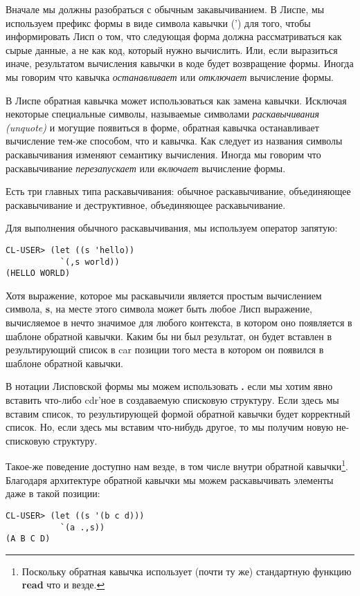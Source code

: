 Вначале мы должны разобраться с обычным закавычиванием. В Лиспе, мы используем префикс формы в виде символа кавычки (') для того, чтобы информировать Лисп о том, что следующая форма должна рассматриваться как сырые данные, а не как код, который нужно вычислить. Или, если выразиться иначе, результатом вычисления кавычки в коде будет возвращение формы. Иногда мы говорим что кавычка \emph{останавливает} или \emph{отключает} вычисление формы.

В Лиспе обратная кавычка может использоваться как замена кавычки. Исключая некоторые специальные символы, называемые символами \emph{раскавычивания (unquote)} и могущие появиться в форме, обратная кавычка останавливает вычисление тем-же способом, что и кавычка. Как следует из названия символы раскавычивания изменяют семантику вычисления. Иногда мы говорим что раскавычивание \emph{перезапускает} или \emph{включает} вычисление формы.

Есть три главных типа раскавычивания: обычное раскавычивание, объединяющее раскавычивание и деструктивное, объединяющее раскавычивание.

Для выполнения обычного раскавычивания, мы используем оператор запятую:

\begin{verbatim}
CL-USER> (let ((s 'hello))
           `(,s world))
(HELLO WORLD)
\end{verbatim}

Хотя выражение, которое мы раскавычили является простым вычислением символа, \textbf{s}, на месте этого символа может быть любое Лисп выражение, вычисляемое в нечто значимое для любого контекста, в котором оно появляется в шаблоне обратной кавычки. Каким бы ни был результат, он будет вставлен в результирующий список в car позиции того места в котором он появился в шаблоне обратной кавычки.

В нотации Лисповской формы мы можем использовать \textbf{.} если мы хотим явно вставить что-либо cdr'ное в создаваемую списковую структуру. Если здесь мы вставим список, то результирующей формой обратной кавычки будет корректный список. Но, если здесь мы вставим что-нибудь другое, то мы получим новую не-списковую структуру.

Такое-же поведение доступно нам везде, в том числе внутри обратной кавычки\footnote{Поскольку обратная кавычка использует (почти ту же) стандартную функцию \textbf{read} что и везде.}. Благодаря архитектуре обратной кавычки мы можем раскавычивать элементы даже в такой позиции:

\begin{verbatim}
CL-USER> (let ((s '(b c d)))
           `(a .,s))
(A B C D)
\end{verbatim}

